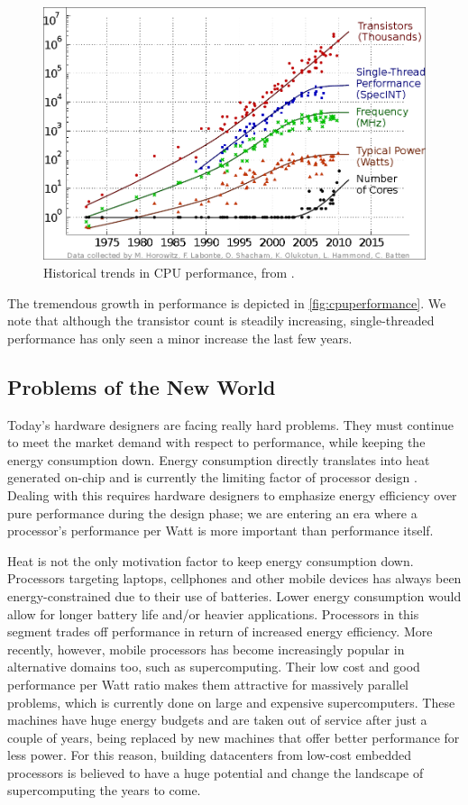 \begin{figure}
    \includegraphics[width=\textwidth]{figs/cpu-performance.png}
    \caption{Historical trends in CPU performance, from \cite{salishan2011}.}
    \label{fig:cpuperformance}
\end{figure}

The tremendous growth in performance is depicted in
\autoref{fig:cpuperformance}. We note that although the transistor count is
steadily increasing, single-threaded performance has only seen a minor increase
the last few years.


\subsection{Problems of the New World}

Today's hardware designers are facing really hard problems. They must continue
to meet the market demand with respect to performance, while keeping the energy
consumption down. Energy consumption directly translates into heat generated
on-chip and is currently the limiting factor of processor design
\cite{hennessy}. Dealing with this requires hardware designers to emphasize
energy efficiency over pure performance during the design phase; we are entering
an era where a processor's performance per Watt is more important than
performance itself.

Heat is not the only motivation factor to keep energy consumption down.
Processors targeting laptops, cellphones and other mobile devices has always
been energy-constrained due to their use of batteries. Lower energy consumption
would allow for longer battery life and/or heavier applications. Processors in
this segment trades off performance in return of increased energy efficiency.
More recently, however, mobile processors has become increasingly popular in
alternative domains too, such as supercomputing. Their low cost and good
performance per Watt ratio makes them attractive for massively parallel
problems, which is currently done on large and expensive supercomputers. These
machines have huge energy budgets and are taken out of service after
just a couple of years, being replaced by new machines that offer better
performance for less power. For this reason, building datacenters from low-cost
embedded processors is believed to have a huge potential and change the
landscape of supercomputing the years to come.


